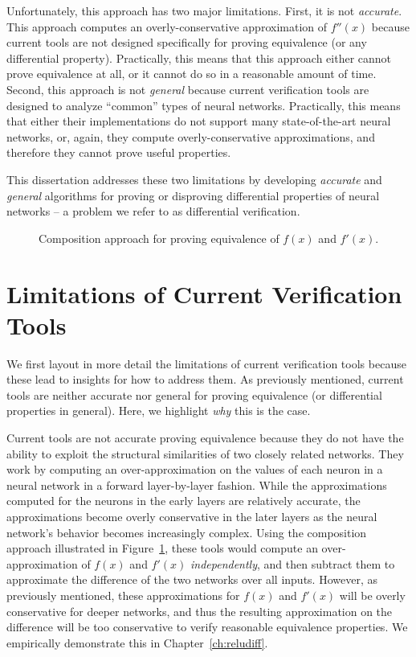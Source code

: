 Unfortunately, this approach has two major limitations. First, it is not
\textit{accurate}. This approach computes an overly-conservative approximation of
$ f''(x) $ because current tools are not designed specifically for proving
equivalence (or any differential property). Practically, this means that this
approach either cannot prove equivalence at all, or it cannot do so in a
reasonable amount of time. Second, this approach is not \textit{general} because
current
verification tools are designed to analyze ``common'' types of neural networks.
Practically, this means that either their implementations do not support many
state-of-the-art neural networks, or, again, they compute overly-conservative
approximations, and therefore they cannot prove useful properties.


This dissertation addresses these two limitations by developing \textit{accurate}
and \textit{general} algorithms for proving or disproving differential properties
of neural networks -- a problem we refer to as differential verification.

\begin{figure}
	\centering
	\scalebox{1.0}{}
	\caption{Composition approach for proving equivalence of $ f(x) $ and $ f'(x)
	$.}
	\label{fig:subbed_nnets_intro}
\end{figure}

\section{Limitations of Current Verification Tools}
We first layout in more detail the limitations of current verification tools
because these lead to insights for how to address them. As previously mentioned,
current tools are neither accurate nor general for proving equivalence (or differential
properties in general). Here, we highlight \textit{why} this is the case.

Current tools are not accurate proving equivalence because they do not have the
ability to exploit the structural similarities of two closely related
networks. They work by computing an
over-approximation on the values of each neuron in a neural network in a forward
layer-by-layer fashion. While the approximations computed for the neurons in the
early layers are relatively accurate, the approximations become overly
conservative in the later layers as the neural network's behavior becomes
increasingly complex. Using the composition
approach illustrated in Figure~\ref{fig:subbed_nnets_intro}, these tools would
compute an
over-approximation of $ f(x) $ and $ f'(x) $  \textit{independently}, and then
subtract them to approximate the difference of the two networks over all inputs.
However, as previously mentioned, these approximations for $ f(x) $ and $ f'(x) $ will
be overly
conservative for deeper networks, and thus the resulting approximation on the
difference will be too conservative to verify reasonable equivalence properties.
We empirically demonstrate this in Chapter~\ref{ch:reludiff}.

